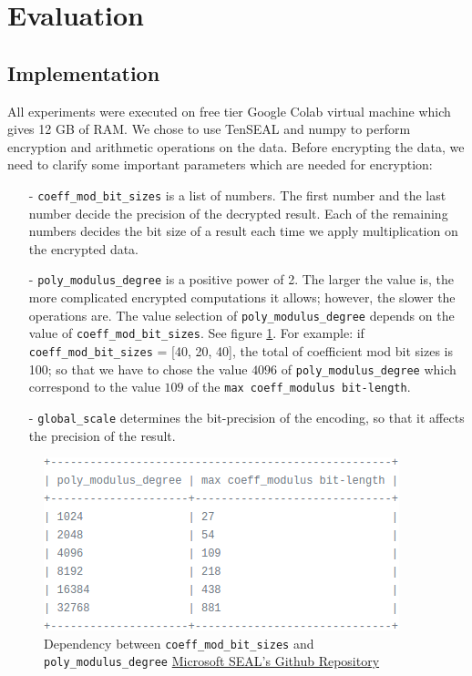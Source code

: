 \section{Evaluation}
    \subsection{Implementation}
    All experiments were executed on free tier Google Colab virtual machine which gives 12 GB of RAM. We chose to use TenSEAL and numpy to perform encryption and arithmetic operations on the data. Before encrypting the data, we need to clarify some important parameters which are needed for encryption:
    \begin{itemize}[nosep]
        \item[-] \texttt{coeff\_mod\_bit\_sizes} is a list of numbers. The first number and the last number decide the precision of the decrypted result. Each of the remaining numbers decides the bit size of a result each time we apply multiplication on the encrypted data.
        \item[-] \texttt{poly\_modulus\_degree} is a positive power of 2. The larger the value is, the more complicated encrypted computations it allows; however, the slower the operations are. The value selection of \texttt{poly\_modulus\_degree} depends on the value of \linebreak \texttt{coeff\_mod\_bit\_sizes}. See figure \ref{fig:coeffpolytable}. For example: if \texttt{coeff\_mod\_bit\_sizes} = [40, 20, 40], the total of coefficient mod bit sizes is 100; so that we have to chose the value $4096$ of \texttt{poly\_modulus\_degree} which correspond to the value $109$ of the \texttt{max coeff\_modulus bit-length}.
        \item[-] \texttt{global\_scale} determines the bit-precision of the encoding, so that it affects the precision of the result.
    \end{itemize}
    
    \begin{figure}[ht]
        \centering
        \includegraphics[width=0.5\linewidth]{images/Screenshot from 2021-10-05 23-37-47.png}
        \caption{Dependency between \texttt{coeff\_mod\_bit\_sizes} and \texttt{poly\_modulus\_degree} \href{https://github.com/microsoft/SEAL/blob/main/native/examples/1_bfv_basics.cpp}{Microsoft SEAL's Github Repository}}
        \label{fig:coeffpolytable}
    \end{figure} 
    

